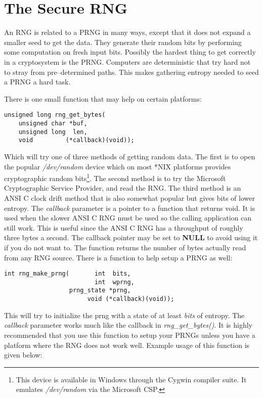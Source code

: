 \documentclass[synpaper]{book}
\newcommand{\mysection}[1]    %
	{                   %
	\section{#1}
   \markboth{\textsf{www.libtom.org}}{\thesection ~ {#1}}
	}
\begin{document}
\mysection{The Secure RNG}
An RNG is related to a PRNG in many ways, except that it does not expand a smaller seed to get the data.  They generate their random bits
by performing some computation on fresh input bits.  Possibly the hardest thing to get correctly in a cryptosystem is the 
PRNG.  Computers are deterministic that try hard not to stray from pre--determined paths.  This makes gathering entropy needed to seed a PRNG 
a hard task.  

There is one small function that may help on certain platforms:
\begin{verbatim}
unsigned long rng_get_bytes(
    unsigned char *buf, 
    unsigned long  len, 
    void         (*callback)(void));
\end{verbatim}

Which will try one of three methods of getting random data.  The first is to open the popular \textit{/dev/random} device which 
on most *NIX platforms provides cryptographic random bits\footnote{This device is available in Windows through the Cygwin compiler suite.  It emulates \textit{/dev/random} via the Microsoft CSP.}.  
The second method is to try the Microsoft Cryptographic Service Provider, and read the RNG.  The third method is an ANSI C 
clock drift method that is also somewhat popular but gives bits of lower entropy.  The \textit{callback} parameter is a pointer to a function that returns void.  It is 
used when the slower ANSI C RNG must be used so the calling application can still work.  This is useful since the ANSI C RNG has a throughput of roughly three 
bytes a second.  The callback pointer may be set to {\bf NULL} to avoid using it if you do not want to.  The function returns the number of bytes actually read from 
any RNG source.  There is a function to help setup a PRNG as well:
\begin{verbatim}
int rng_make_prng(       int  bits, 
                         int  wprng, 
                  prng_state *prng, 
                       void (*callback)(void));
\end{verbatim}
This will try to initialize the prng with a state of at least \textit{bits} of entropy.  The \textit{callback} parameter works much like
the callback in \textit{rng\_get\_bytes()}.  It is highly recommended that you use this function to setup your PRNGs unless you have a
platform where the RNG does not work well.  Example usage of this function is given below:
\end{document}
